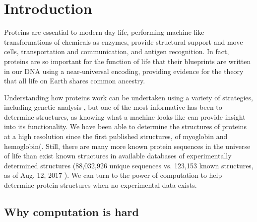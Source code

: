 \chapter{Introduction}

Proteins are essential to modern day life,
performing machine-like transformations of chemicals as enzymes,
provide structural support and move cells,
transportation and communication,
and antigen recognition.
In fact, proteins are so important for the function of life that their blueprints are written in our DNA\cite{avery_studies_1944} using a near-universal encoding\cite{crick_origin_1968,hinegardner_rationale_1963},
providing evidence for the theory that all life on Earth shares common ancestry\cite{darwin_origin_1859}.

Understanding how proteins work can be undertaken using a variety of strategies, including genetic analysis \cite{lander_initial_2001}, but one of the most informative has been to determine structures, as knowing what a machine looks like can provide insight into its functionality.
We have been able to determine the structures of proteins at a high resolution since the first published structures, of myoglobin and hemoglobin(\cite{kendrew_three-dimensional_1958,perutz_structure_1960}.
Still, there are many more known protein sequences in the universe of life than exist known structures in available databases of experimentally determined structures (88,032,926 unique sequences vs. 123,153 known structures, as of Aug. 12, 2017 \cite{berman_protein_2000,noauthor_uniprot:_2017}).
We can turn to the power of computation to help determine protein structures when no experimental data exists.

\section{Why computation is hard}

